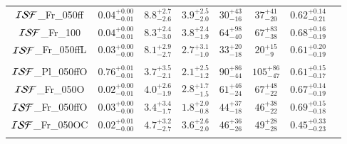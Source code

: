 \documentclass[submission,phys]{lib/SciPost}
\begin{document}
\begin{table}
\begin{tabular}{c c c c c c c c}
           ${\cal ISF}$\_Fr\_050ff   & $0.04^{+0.00}_{-0.01}$ & $8.8^{+2.7}_{-2.6}$ & $3.9^{+2.5}_{-2.0}$ & $30^{+43}_{-16}$ & $37^{+41}_{-20}$ & $0.62^{+0.14}_{-0.21}$ \vspace{0.25em}\\
           ${\cal ISF}$\_Fr\_100      & $0.04^{+0.00}_{-0.01}$ & $8.3^{+2.4}_{-3.0}$ & $3.8^{+2.4}_{-1.9}$ & $64^{+98}_{-40}$ & $67^{+83}_{-38}$ & $0.68^{+0.16}_{-0.19}$ \vspace{0.25em}\\
           ${\cal ISF}$\_Fr\_050ffL  & $0.03^{+0.00}_{-0.00}$ & $8.1^{+2.9}_{-2.7}$ & $2.7^{+3.1}_{-1.0}$ & $33^{+20}_{-18}$ & $20^{+15}_{-9}$ & $0.61^{+0.20}_{-0.19}$ \vspace{0.25em}\\
           \hline \vspace{-0.75em}\\
           ${\cal ISF}$\_Pl\_050ffO  & $0.76^{+0.01}_{-0.01}$ & $3.7^{+3.5}_{-2.1}$ & $2.1^{+2.5}_{-1.2}$ & $90^{+86}_{-44}$ & $105^{+86}_{-47}$ & $0.61^{+0.15}_{-0.17}$ \vspace{0.25em}\\
           ${\cal ISF}$\_Fr\_050O    & $0.02^{+0.00}_{-0.01}$ & $4.0^{+2.6}_{-1.9}$ & $2.8^{+1.7}_{-1.5}$ & $61^{+46}_{-24}$ & $67^{+48}_{-22}$ & $0.67^{+0.14}_{-0.19}$ \vspace{0.25em}\\
           ${\cal ISF}$\_Fr\_050ffO  & $0.03^{+0.00}_{-0.00}$ & $3.4^{+3.4}_{-1.7}$ & $1.8^{+2.0}_{-0.8}$ & $44^{+37}_{-18}$ & $46^{+38}_{-22}$ & $0.69^{+0.15}_{-0.18}$ \vspace{0.25em}\\
           ${\cal ISF}$\_Fr\_050OC   & $0.02^{+0.01}_{-0.00}$ & $4.7^{+3.2}_{-2.7}$ & $3.6^{+2.6}_{-2.0}$ & $46^{+36}_{-26}$ & $49^{+28}_{-28}$ & $0.45^{+0.33}_{-0.23}$ \vspace{0.25em}\\
           \hline
         \hline                                   %
         \label{Tab:Final_ISF_FFC_Results}
        \end{tabular}
     \end{table}
\end{document}
